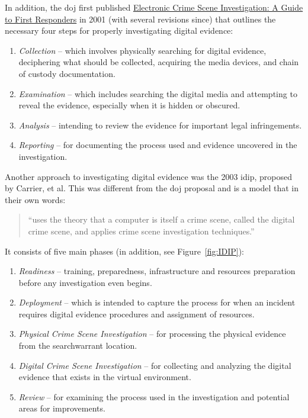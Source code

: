 \documentclass[12pt]{article}
\begin{document}
In addition, the \gls{doj} first published 
\uline{Electronic Crime Scene Investigation: A Guide to First Responders}
\cite{ballou2010electronic} in 2001 (with several revisions since) that outlines
the necessary four steps for properly investigating digital evidence:

\vspace{0.5 cm}
\begin{enumerate}
  \item {\em Collection} -- which involves physically searching for digital evidence,
  deciphering what should be collected, acquiring the media devices,
  and chain of custody documentation.
  \item {\em Examination} -- which includes searching the digital media
  and attempting to reveal the evidence, especially when it is
  hidden or obscured.
  \item {\em Analysis} -- intending to review the evidence for important
  legal infringements. 
  \item {\em Reporting} -- for documenting the process used and evidence
  uncovered in the investigation.
\end{enumerate}
\vspace{0.5 cm}

Another approach to investigating digital evidence was the 2003
\gls{idip}\cite{carrier2003getting},
proposed by Carrier, et al.  This was different from the \gls{doj} proposal and
is a model that in their own words:
\begin{quote}
``uses the theory that a computer is itself a crime scene,
called the digital crime scene, and applies crime scene
investigation techniques.''
\end{quote}
It consists of five main phases (in addition, see Figure~\ref{fig:IDIP}):

\vspace{0.5 cm}
\begin{enumerate}
  \item {\em Readiness} -- training, preparedness, infrastructure and resources
  preparation before any investigation even begins.
  \item {\em Deployment} -- which is intended to capture the process for when an 
  incident requires digital evidence procedures and assignment of resources.
  \item {\em Physical Crime Scene Investigation} -- for processing the physical
  evidence from the \gls{searchwarrant} location.
  \item {\em Digital Crime Scene Investigation} -- for collecting and
  analyzing the digital evidence that exists in the virtual environment.
  \item {\em Review} -- for examining the process used in the investigation and
  potential areas for improvements. 
\end{enumerate}
\vspace{0.5 cm}
\end{document}
